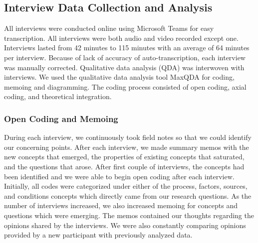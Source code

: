 
\subsection{Interview Data Collection and Analysis}
All interviews were conducted online using Microsoft Teams for easy transcription. All interviews were both audio and video recorded except one. Interviews lasted from 42 minutes to 115 minutes with an average of 64 minutes per interview. Because of lack of accuracy of auto-transcription, each interview was manually corrected.  
Qualitative data analysis (QDA) was interwoven with interviews. We used the qualitative data analysis tool MaxQDA
\cite{website:maxqda} for coding, memoing and diagramming. The coding process consisted of open coding, axial coding, and theoretical integration. 

\subsubsection{Open Coding and Memoing} During each interview, we continuously took field notes so that we could identify our concerning points. After each interview, we made summary memos with the new concepts that emerged, the properties of existing concepts that saturated, and the questions that arose. After first couple of interviews, the concepts had been identified and we were able to begin open coding after each interview. Initially, all codes were categorized under either of the process, factors, sources, and conditions concepts which directly came from our research questions. As the number of interviews increased, we also increased memoing for concepts and questions which were emerging. The memos contained our thoughts regarding the opinions shared by the interviews. We were also constantly comparing opinions provided by a new participant with previously analyzed data. 

